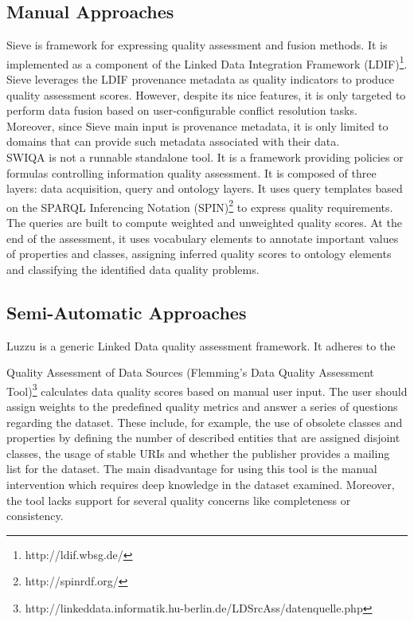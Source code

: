 \documentclass[onecolumn, crcready]{iosart2c}
\begin{document}
\subsection{Manual Approaches}

Sieve \cite{Mendes2012} is framework for expressing quality assessment and fusion methods. It is implemented as a component of the Linked Data Integration Framework (LDIF)\footnote{http://ldif.wbsg.de/}. Sieve leverages the LDIF provenance metadata as quality indicators to produce quality assessment scores. However, despite its nice features, it is only targeted to perform data fusion based on user-configurable conflict resolution tasks. Moreover, since Sieve main input is provenance metadata, it is only limited to domains that can provide such metadata associated with their data.\\

SWIQA \cite{Furber2011a} is not a runnable standalone tool. It is a framework providing policies or formulas controlling information quality assessment. It is composed of three layers: data acquisition, query and ontology layers. It uses query templates based on the SPARQL Inferencing Notation (SPIN)\footnote{http://spinrdf.org/} to express quality requirements. The queries are built to compute weighted and unweighted quality scores. At the end of the assessment, it uses vocabulary elements to annotate important values of properties and classes, assigning inferred quality scores to ontology elements and classifying the identified data quality problems.

\subsection{Semi-Automatic Approaches}

Luzzu \cite{DBLP:journals/corr/DebattistaLLA14} is a generic Linked Data quality assessment framework. It adheres to the

Quality Assessment of Data Sources (Flemming's Data Quality Assessment Tool)\footnote{http://linkeddata.informatik.hu-berlin.de/LDSrcAss/datenquelle.php} calculates data quality scores based on manual user input. The user should assign weights to the predefined quality metrics and answer a series of questions regarding the dataset. These include, for example, the use of obsolete classes and properties by defining the number of described entities that are assigned disjoint classes, the usage of stable URIs and whether the publisher provides a mailing list for the dataset. The main disadvantage for using this tool is the manual intervention which requires deep knowledge in the dataset examined. Moreover, the tool lacks support for several quality concerns like completeness or consistency.\\
\end{document}
